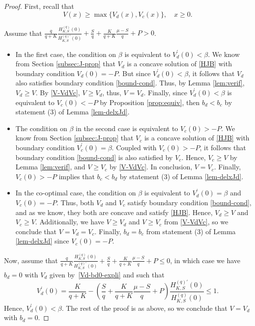 \documentclass[11pt,reqno]{amsart}
\newcommand{\Hq}{H^{(q)}_{K,S}}
\newcommand{\Hqprime}{H^{(q) \prime}_{K,S}}
\newcommand{\ettaz}{\frac{S}{q} + \frac{K}{q+K}\frac{\mu - S}{q}}
\renewcommand{\geq}{\geqslant}
\renewcommand{\leq}{\leqslant}
\begin{document}
\begin{proof}
First, recall that
\begin{equation}\label{V-VdVc}
V(x) \geq \max\{V_d(x), V_c(x)\}, \quad x\geq 0.
\end{equation}

Assume that $\frac{q}{q+K}\frac{\Hq(0)}{\Hqprime(0)} + \ettaz + P > 0$.
    \begin{itemize}
        \item In the first case, the condition on $\beta$ is equivalent to $V^\prime_d(0) < \beta$. We know from Section \ref{subsec:J-prop} that $V_d$ is a concave solution of \eqref{HJB} with boundary condition $V_d(0) = -P$. But since $V^\prime_d(0) < \beta$, it follows that $V_d$ also satisfies boundary condition \eqref{bound-cond}. Thus, by Lemma \ref{lem:verif}, $V_d \geq V$. By \eqref{V-VdVc}, $V\geq V_d$, thus, $V = V_d$. Finally, since $V^\prime_d(0) < \beta$ is equivalent to $V_c(0)<-P$ by Proposition \ref{prop:equiv}, then $b_d < b_c$ by statement (3) of Lemma \ref{lem-delxJd}.
        \item The condition on $\beta$ in the second case is equivalent to $V_c(0) > -P$. We know from Section \ref{subsec:J-prop} that $V_c$ is a concave solution of \eqref{HJB} with boundary condition $V^\prime_c(0) = \beta$. Coupled with $V_c(0) > -P$, it follows that boundary condition \eqref{bound-cond} is also satisfied by $V_c$. Hence, $V_c\geq V$ by Lemma \ref{lem:verif}, and $V\geq V_c$ by \eqref{V-VdVc}. In conclusion, $V = V_c$. Finally, $V_c(0) > -P$ implies that $b_c < b_d$ by statement (3) of Lemma \ref{lem-delxJd}.
        \item In the co-optimal case, the condition on $\beta$ is equivalent to $V^\prime_d(0) = \beta$ and $V_c(0) = -P$. Thus, both $V_d$ and $V_c$ satisfy boundary condition \eqref{bound-cond}, and as we know, they both are concave and satisfy \eqref{HJB}. Hence, $V_d\geq V$ and $V_c\geq V$. Additionally, we have $V\geq V_d$ and $V\geq V_c$ from \eqref{V-VdVc}, so we conclude that $V = V_d = V_c$. Finally, $b_d=b_c$ from statement (3) of Lemma \ref{lem-delxJd} since $V_c(0) = -P$. 
    \end{itemize}

Now, assume that $\frac{q}{q+K}\frac{\Hq(0)}{\Hqprime(0)} + \ettaz + P \leq 0$, in which case we have $b_d=0$ with $V_d$ given by~\eqref{Vd-bd0-expli} and such that
    \begin{equation}
        V^\prime_d(0) = \frac{K}{q+K} - \left(\ettaz + P\right)\frac{\Hqprime(0)}{\Hq(0)} \leq 1.
    \end{equation}
Hence, $V^\prime_d(0) < \beta$. The rest of the proof is as above, so we conclude that $V=V_d$ with $b_d=0$. 
\end{proof}
\end{document}
